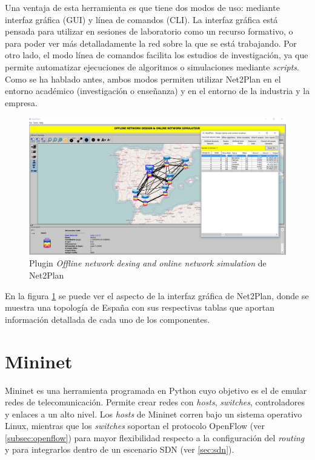 Una ventaja de esta herramienta es que tiene dos modos de uso: mediante interfaz gráfica (\ac{GUI}) y línea de comandos (\ac{CLI}). La interfaz gráfica está pensada para utilizar en sesiones de laboratorio como un recurso formativo, o para poder ver más detalladamente la red sobre la que se está trabajando. Por otro lado, el modo línea de comandos facilita los estudios de investigación, ya que permite automatizar ejecuciones de algoritmos o simulaciones mediante \textit{scripts}. Como se ha hablado antes, ambos modos permiten utilizar Net2Plan en el entorno académico (investigación o enseñanza) y en el entorno de la industria y la empresa.

\begin{figure}[ht!]
	\centering
	\includegraphics[width=1\linewidth]{imagenes/n2p_redes}
	\caption{Plugin \textit{Offline network desing and online network simulation} de Net2Plan}
	\label{fig:n2p_redes}
\end{figure}

En la figura \ref{fig:n2p_redes} se puede ver el aspecto de la interfaz gráfica de Net2Plan, donde se muestra una topología de España con sus respectivas tablas que aportan información detallada de cada uno de los componentes.

\section{Mininet}
\label{sec:mininet}

Mininet\cite{mininetbib} es una herramienta programada en Python cuyo objetivo es el de emular redes de telecomunicación. Permite crear redes con \textit{hosts}, \textit{switches}, controladores y enlaces a un alto nivel. Los \textit{hosts} de Mininet corren bajo un sistema operativo Linux, mientras que los \textit{switches} soportan el protocolo OpenFlow (ver \ref{subsec:openflow}) para mayor flexibilidad respecto a la configuración del \textit{routing} y para integrarlos dentro de un escenario \ac{SDN} (ver \ref{sec:sdn}).

